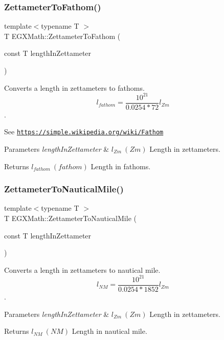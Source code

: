 \subsubsection{\texorpdfstring{Zettameter\+To\+Fathom()}{ZettameterToFathom()}}
{\footnotesize\ttfamily template$<$typename T $>$ \\
T E\+G\+X\+Math\+::\+Zettameter\+To\+Fathom (\begin{DoxyParamCaption}\item[{const T}]{length\+In\+Zettameter }\end{DoxyParamCaption})}



Converts a length in zettameters to fathoms. \[ l_{fathom}= \frac{10^{21}}{0.0254 * 72} l_{Zm} \]. 

See \href{https://simple.wikipedia.org/wiki/Fathom}{\tt https\+://simple.\+wikipedia.\+org/wiki/\+Fathom} 
\begin{DoxyParams}{Parameters}
{\em length\+In\+Zettameter} & $ l_{Zm}\ (Zm)$ Length in zettameters. \\
\hline
\end{DoxyParams}
\begin{DoxyReturn}{Returns}
$ l_{fathom}\ (fathom)$ Length in fathoms. 
\end{DoxyReturn}
\mbox{\label{group___e_g_x_math-_conversions-_length_conversions-_zettameter-_nautical_ga474eb2cb88740b3dd9e13fa6e8aa4558}} 
\subsubsection{\texorpdfstring{Zettameter\+To\+Nautical\+Mile()}{ZettameterToNauticalMile()}}
{\footnotesize\ttfamily template$<$typename T $>$ \\
T E\+G\+X\+Math\+::\+Zettameter\+To\+Nautical\+Mile (\begin{DoxyParamCaption}\item[{const T}]{length\+In\+Zettameter }\end{DoxyParamCaption})}



Converts a length in zettameters to nautical mile. \[ l_{NM}= \frac{10^{21}}{0.0254 * 1852} l_{Zm} \]. 


\begin{DoxyParams}{Parameters}
{\em length\+In\+Zettameter} & $ l_{Zm}\ (Zm)$ Length in zettameters. \\
\hline
\end{DoxyParams}
\begin{DoxyReturn}{Returns}
$ l_{NM}\ (NM)$ Length in nautical mile. 
\end{DoxyReturn}
